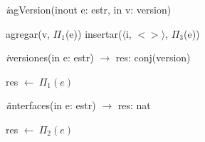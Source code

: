 \textit{i}agVersion(inout e: estr, in v: version)\\
\begin{algorithm}[H]
\BlankLine
agregar(v, $\Pi_1$(e))
\BlankLine
insertar($\langle$i, $<>\rangle$, $\Pi_3$(e))
\end{algorithm}

\textit{i}versiones(in e: estr) $\longrightarrow$ res: conj(version)\\
\begin{algorithm}[H]
\BlankLine
res $\leftarrow\ \Pi_1(e)$
\end{algorithm}

\textit{i}interfaces(in e: estr) $\longrightarrow$ res: nat\\
\begin{algorithm}[H]
\BlankLine
res $\leftarrow\ \Pi_2(e)$
\end{algorithm}
